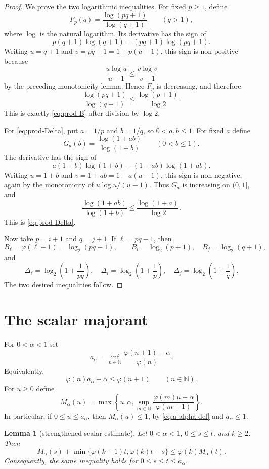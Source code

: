 \documentclass[11pt]{article}
\newtheorem{lemma}[theorem]{Lemma}
\newcommand{\N}{\mathbb N}
\newcommand{\ph}{\varphi}
\begin{document}
\begin{proof}
We prove the two logarithmic inequalities.  For fixed $p\ge 1$, define
\[
 F_p(q)=\frac{\log(pq+1)}{\log(q+1)}\qquad(q>1),
\]
where $\log$ is the natural logarithm.  Its derivative has the sign of
\[
 p(q+1)\log(q+1)-(pq+1)\log(pq+1).
\]
Writing $u=q+1$ and $v=pq+1=1+p(u-1)$, this sign is non-positive because
\[
 \frac{u\log u}{u-1}\le \frac{v\log v}{v-1}
\]
by the preceding monotonicity lemma.  Hence $F_p$ is decreasing, and therefore
\[
 \frac{\log(pq+1)}{\log(q+1)}\le
 \frac{\log(p+1)}{\log 2}.
\]
This is exactly \eqref{eq:prod-B} after division by $\log 2$.

For \eqref{eq:prod-Delta}, put $a=1/p$ and $b=1/q$, so $0<a,b\le 1$.  For fixed $a$ define
\[
 G_a(b)=\frac{\log(1+ab)}{\log(1+b)}\qquad(0<b\le 1).
\]
The derivative has the sign of
\[
 a(1+b)\log(1+b)-(1+ab)\log(1+ab).
\]
Writing $u=1+b$ and $v=1+ab=1+a(u-1)$, this sign is non-negative, again by the monotonicity of
$u\log u/(u-1)$.  Thus $G_a$ is increasing on $(0,1]$, and
\[
 \frac{\log(1+ab)}{\log(1+b)}\le
 \frac{\log(1+a)}{\log 2}.
\]
This is \eqref{eq:prod-Delta}.

Now take $p=i+1$ and $q=j+1$.  If $\ell=pq-1$, then
\[
 B_\ell=\ph(\ell+1)=\log_2(pq+1),
 \qquad
 B_i=\log_2(p+1),\quad B_j=\log_2(q+1),
\]
and
\[
 \Delta_\ell=\log_2\left(1+\frac1{pq}\right),
 \quad
 \Delta_i=\log_2\left(1+\frac1p\right),
 \quad
 \Delta_j=\log_2\left(1+\frac1q\right).
\]
The two desired inequalities follow.
\end{proof}

\section{The scalar majorant}

For $0<\alpha<1$ set
\[
 a_\alpha=\inf_{n\in\N}\frac{\ph(n+1)-\alpha}{\ph(n)}.
\]
Equivalently,
\begin{equation}
 \ph(n)a_\alpha+\alpha\le \ph(n+1)\qquad(n\in\N).
 \label{eq:a-alpha-def}
\end{equation}
For $u\ge 0$ define
\[
 M_\alpha(u)=\max\left\{u,\alpha,
 \sup_{m\in\N}\frac{\ph(m)u+\alpha}{\ph(m+1)}\right\}.
\]
In particular, if $0\le u\le a_\alpha$, then $M_\alpha(u)\le 1$, by
\eqref{eq:a-alpha-def} and $a_\alpha\le 1$.

\begin{lemma}[strengthened scalar estimate]
Let $0<\alpha<1$, $0\le s\le t$, and $k\ge 2$.  Then
\begin{equation}
 M_\alpha(s)+\min\{\ph(k-1)t,\ph(k)t-s\}
 \le \ph(k)M_\alpha(t).
 \label{eq:strong-scalar}
\end{equation}
Consequently, the same inequality holds for $0\le s\le t\le a_\alpha$.
\end{lemma}
\end{document}
